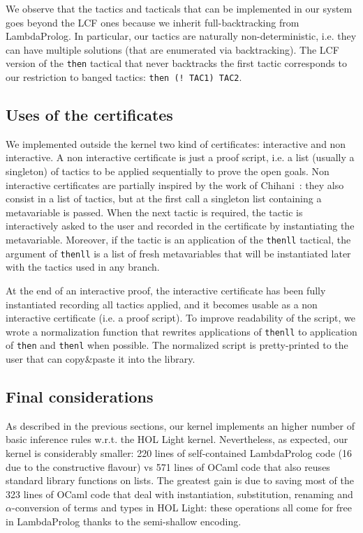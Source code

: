 \documentclass[preprint]{sigplanconf}
\begin{document}
We observe that the tactics and tacticals that can be implemented in our system goes beyond the LCF ones because we inherit full-backtracking from LambdaProlog. In particular, our tactics are naturally non-deterministic, i.e. they can have multiple solutions (that are enumerated via backtracking).
The LCF version of the \verb+then+ tactical that never backtracks the first tactic corresponds to our restriction to banged tactics: \verb+then (! TAC1) TAC2+.

\subsection{Uses of the certificates}

We implemented outside the kernel two kind of certificates: interactive and non interactive. A non interactive certificate is just a proof script, i.e. a list (usually a singleton) of tactics to be applied sequentially to prove the open goals. Non interactive certificates are partially inspired by the work of Chihani~\cite{zak1}: they also consist in a list of tactics, but at the first call a singleton list containing a metavariable is passed. When the next tactic is required, the tactic is interactively asked to the user and recorded in the certificate by instantiating the metavariable. Moreover, if the tactic is an application of the \texttt{thenll} tactical, the argument of \texttt{thenll} is a list of fresh metavariables that will be instantiated later with the tactics used in any branch.

At the end of an interactive proof, the interactive certificate has been fully instantiated recording all tactics applied, and it becomes usable as a non interactive certificate (i.e. a proof script). To improve readability of the script, we wrote a normalization function that rewrites applications of \texttt{thenll} to application of \texttt{then} and \texttt{thenl} when possible. The normalized script is pretty-printed to the user that can copy\&paste it into the library.

\subsection{Final considerations}

As described in the previous sections, our kernel implements an higher number
of basic inference rules w.r.t. the HOL Light kernel. Nevertheless, as expected, our kernel is considerably smaller: 220 lines of self-contained LambdaProlog code (16 due to the constructive flavour) vs 571 lines of OCaml code that also reuses standard library functions on lists. The greatest gain is due to saving most of the 323 lines of OCaml code that deal with instantiation, substitution, renaming and $\alpha$-conversion of terms and types in HOL Light: these operations all come for free in LambdaProlog thanks to the semi-shallow encoding.
\end{document}
